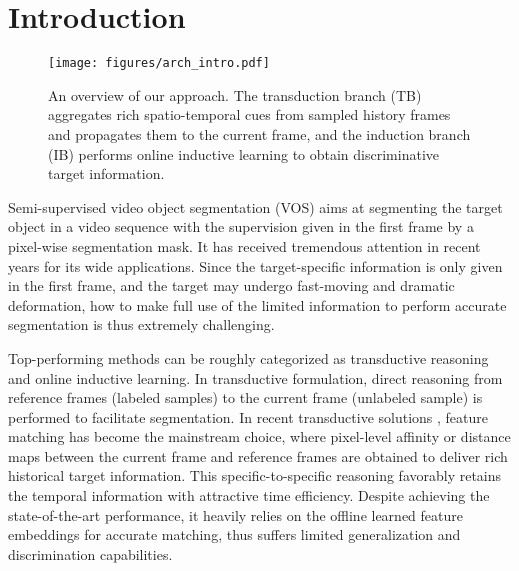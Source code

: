 \documentclass[10pt,twocolumn,letterpaper]{article}
\begin{document}
\section{Introduction}

\begin{figure}[t]
	\begin{center}
	\texttt{[image: figures/arch\_intro.pdf]}
	\vspace{-2.0em}
	\end{center}
\caption{An overview of our approach. The transduction branch (TB) aggregates rich spatio-temporal cues from sampled history frames and propagates them to the current frame, and the induction branch (IB) performs online inductive learning to obtain discriminative target information.}
	\label{fig:intro}
	\vspace{-1.0em}
\end{figure}

Semi-supervised video object segmentation (VOS) aims at segmenting the target object in a video sequence with the supervision given in the first frame by a pixel-wise segmentation mask. It has received tremendous attention in recent years for its wide applications. Since the target-specific information is only given in the first frame, and the target may undergo fast-moving and dramatic deformation, how to make full use of the limited information to perform accurate segmentation is thus extremely challenging.

Top-performing methods can be roughly categorized as transductive reasoning and online inductive learning. In transductive formulation, direct reasoning from reference frames (labeled samples) to the current frame (unlabeled sample) is performed to facilitate segmentation.
In recent transductive solutions \cite{contrastrandomwalk2020A,mast2020A,lu2020A,Seoung2019A,Seong2020A,colorvideo2018,ContrastiveWN2021A,CFBI2020A}, feature matching has become the mainstream choice, where pixel-level affinity or distance maps between the current frame and reference frames are obtained to deliver rich historical target information. This specific-to-specific reasoning favorably retains the temporal information with attractive time efficiency. Despite achieving the state-of-the-art performance, it heavily relies on the offline learned feature embeddings for accurate matching, thus suffers limited generalization and discrimination capabilities.
\end{document}
